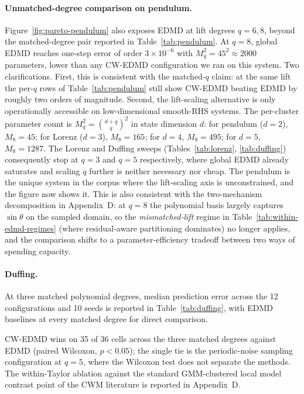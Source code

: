 \documentclass{article}
\begin{document}
\paragraph{Unmatched-degree comparison on pendulum.} Figure~\ref{fig:pareto-pendulum} also exposes EDMD at lift degrees $q{=}6, 8$, beyond the matched-degree pair reported in Table~\ref{tab:pendulum}. At $q{=}8$, global EDMD reaches one-step error of order $3\!\times\!10^{-6}$ with $M_q^2 = 45^2 \approx 2000$ parameters, lower than any CW-EDMD configuration we ran on this system. Two clarifications. First, this is consistent with the matched-$q$ claim: at the same lift the per-$q$ rows of Table~\ref{tab:pendulum} still show CW-EDMD beating EDMD by roughly two orders of magnitude. Second, the lift-scaling alternative is only operationally accessible on low-dimensional smooth-RHS systems. The per-cluster parameter count is $M_q^2 = \binom{d+q}{q}^2$ in state dimension $d$: for pendulum ($d{=}2$), $M_8 = 45$; for Lorenz ($d{=}3$), $M_8 = 165$; for $d{=}4$, $M_8 = 495$; for $d{=}5$, $M_8 = 1287$. The Lorenz and Duffing sweeps (Tables~\ref{tab:lorenz}, \ref{tab:duffing}) consequently stop at $q{=}3$ and $q{=}5$ respectively, where global EDMD already saturates and scaling $q$ further is neither necessary nor cheap. The pendulum is the unique system in the corpus where the lift-scaling axis is unconstrained, and the figure now shows it. This is also consistent with the two-mechanism decomposition in Appendix~D: at $q{=}8$ the polynomial basis largely captures $\sin\theta$ on the sampled domain, so the \emph{mismatched-lift} regime in Table~\ref{tab:within-edmd-regimes} (where residual-aware partitioning dominates) no longer applies, and the comparison shifts to a parameter-efficiency tradeoff between two ways of spending capacity.

\paragraph{Duffing.} At three matched polynomial degrees, median prediction error across the 12 configurations and 10 seeds is reported in Table~\ref{tab:duffing}, with EDMD baselines at every matched degree for direct comparison.
\begin{table}[H]
\caption{Duffing oscillator: median prediction error (dimensionless state-space units) across 12 configurations and 10 seeds. Top block: EDMD at four polynomial lift degrees ($q{=}2$ as a low-lift reference; $q{=}3, 4, 5$ each as the matched-degree baseline for the corresponding CW-EDMD row). Bottom block: CW-EDMD at three matched lift degrees. Bold marks the column-wise minimum.}
\label{tab:duffing}
\centering\small

\end{table}
\noindent CW-EDMD wins on 35 of 36 cells across the three matched degrees against EDMD (paired Wilcoxon, $p<0.05$); the single tie is the periodic-noise sampling configuration at $q{=}5$, where the Wilcoxon test does not separate the methods. The within-Taylor ablation against the standard GMM-clustered local model contrast point of the CWM literature is reported in Appendix~D.
\end{document}
